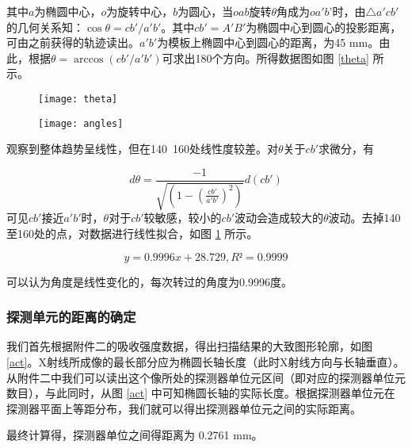 \documentclass[withoutpreface,bwprint]{cumcmthesis} %
\begin{document}
      其中$a$为椭圆中心，$o$为旋转中心，$b$为圆心，当$oab$旋转$\theta$角成为$oa'b$'时，由$\triangle {a'cb'}$的几何关系知：$\cos\theta={cb'}/{a'b'}$。其中$cb'=A'B'$为椭圆中心到圆心的投影距离，可由之前获得的轨迹读出。$a'b'$为模板上椭圆中心到圆心的距离，为45 mm。由此，根据$\theta= \arccos({cb'}/{a'b'})$可求出180个方向。所得数据图如图 \ref{theta} 所示。


      \begin{figure}[!htbp]
        \begin{minipage}[t]{0.5\linewidth}
          \centering
          \texttt{[image: theta]}
          \caption{}
          \label{theta}
        \end{minipage}
        \begin{minipage}[t]{0.5\linewidth}
          \centering
          \texttt{[image: angles]}
          \caption{}
          \label{angles}
        \end{minipage}
      \end{figure}

      观察到整体趋势呈线性，但在140~160处线性度较差。对$\theta$关于$cb'$求微分，有

      \begin{equation}
        d\theta=\frac{-1}{\sqrt{(1-(\frac{cb'}{a'b'})^2)}}d(cb')
      \end{equation}
      可见$cb'$接近$a'b'$时，$\theta$对于$cb'$较敏感，较小的$cb'$波动会造成较大的$\theta$波动。去掉140至160处的点，对数据进行线性拟合，如图 \ref{angles} 所示。

      \begin{equation}
        y = 0.9996x + 28.729,R² = 0.9999
      \end{equation}

      可以认为角度是线性变化的，每次转过的角度为0.9996度。

    \subsubsection{探测单元的距离的确定}

      我们首先根据附件二的吸收强度数据，得出扫描结果的大致图形轮廓，如图 \ref{act}。X射线所成像的最长部分应为椭圆长轴长度（此时X射线方向与长轴垂直）。从附件二中我们可以读出这个像所处的探测器单位元区间（即对应的探测器单位元数目），与此同时，从图 \ref{act} 中可知椭圆长轴的实际长度。根据探测器单位元在探测器平面上等距分布，我们就可以得出探测器单位元之间的实际距离。

      最终计算得，探测器单位之间得距离为 0.2761 mm。
\end{document}
